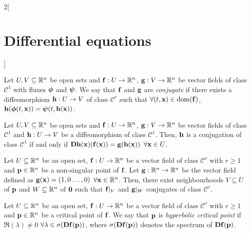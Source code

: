 \documentclass[../../../main.tex]{subfiles}
\begin{document}
\begin{multicols}{2}[\section{Differential equations}]
\begin{definition}
  \end{definition}
  \begin{definition}
    Let $U,V\subseteq \mathbb{R}^n$ be open sets and $\boldsymbol{\mathrm{f}}:U\rightarrow\mathbb{R}^n$, $\boldsymbol{\mathrm{g}}:V\rightarrow\mathbb{R}^n$ be vector fields of class $\mathcal{C}^1$ with fluxes $\boldsymbol{\mathrm{\phi}}$ and $\boldsymbol{\mathrm{\psi}}$. We say that $\boldsymbol{\mathrm{f}}$ and $\boldsymbol{\mathrm{g}}$ are \textit{conjugate} if there exists a diffeomorphism $\boldsymbol{\mathrm{h}}:U\rightarrow V$ of class $\mathcal{C}^r$ such that $\forall (t,\boldsymbol{\mathrm{x}})\in \operatorname{dom}(\boldsymbol{\mathrm{f}})$, $\boldsymbol{\mathrm{h}}(\boldsymbol{\mathrm{\phi}}(t,\boldsymbol{\mathrm{x}}))=\boldsymbol{\mathrm{\psi}}(t,\boldsymbol{\mathrm{h}}(\boldsymbol{\mathrm{x}}))$.
  \end{definition}
  \begin{lemma}
    Let $U,V\subseteq \mathbb{R}^n$ be open sets and $\boldsymbol{\mathrm{f}}:U\rightarrow\mathbb{R}^n$, $\boldsymbol{\mathrm{g}}:V\rightarrow\mathbb{R}^n$ be vector fields of class $\mathcal{C}^1$ and $\boldsymbol{\mathrm{h}}:U\rightarrow V$ be a diffeomorphism of class $\mathcal{C}^1$. Then, $\boldsymbol{\mathrm{h}}$ is a conjugation of class $\mathcal{C}^1$ if and only if $\boldsymbol{\mathrm{Dh}}(\boldsymbol{\mathrm{x}})(\boldsymbol{\mathrm{f}}(\boldsymbol{\mathrm{x}}))=\boldsymbol{\mathrm{g}}(\boldsymbol{\mathrm{h}}(\boldsymbol{\mathrm{x}}))$ $\forall \boldsymbol{\mathrm{x}}\in U$.
  \end{lemma}
  \begin{theorem}
    Let $U\subseteq \mathbb{R}^n$ be an open set, $\boldsymbol{\mathrm{f}}:U\rightarrow\mathbb{R}^n$ be a vector field of class $\mathcal{C}^r$ with $r\geq 1$ and $\boldsymbol{\mathrm{p}}\in\mathbb{R}^n$ be a non-singular point of $\boldsymbol{\mathrm{f}}$. Let $\boldsymbol{\mathrm{g}}:\mathbb{R}^n\rightarrow\mathbb{R}^n$ be the vector field defined as $\boldsymbol{\mathrm{g}}(\boldsymbol{\mathrm{x}})=(1,0\ldots,0)$ $\forall \boldsymbol{\mathrm{x}}\in\mathbb{R}^n$. Then, there exist neighbourhoods $V\subseteq U$ of $\boldsymbol{\mathrm{p}}$ and $W\subseteq \mathbb{R}^n$ of $\boldsymbol{\mathrm{0}}$ such that $\boldsymbol{\mathrm{f}}|_V$ and $\boldsymbol{\mathrm{g}}|_W$ conjugates of class $\mathcal{C}^r$.
  \end{theorem}
  \begin{definition}
    Let $U\subseteq \mathbb{R}^n$ be an open set, $\boldsymbol{\mathrm{f}}:U\rightarrow\mathbb{R}^n$ be a vector field of class $\mathcal{C}^r$ with $r\geq 1$ and $\boldsymbol{\mathrm{p}}\in\mathbb{R}^n$ be a critical point of $\boldsymbol{\mathrm{f}}$. We say that $\boldsymbol{\mathrm{p}}$ is \emph{hyperbolic critical point} if $\Re(\lambda)\ne 0$ $\forall \lambda\in\sigma(\boldsymbol{\mathrm{Df}}(\boldsymbol{\mathrm{p}}))$, where $\sigma(\boldsymbol{\mathrm{Df}}(\boldsymbol{\mathrm{p}}))$ denotes the spectrum of $\boldsymbol{\mathrm{Df}}(\boldsymbol{\mathrm{p}})$.

\end{definition}
\end{multicols}
\end{document}
